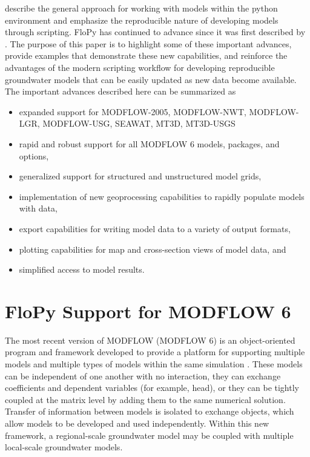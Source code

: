 \documentclass[11pt, oneside]{article}   	%
\begin{document}
\cite{bakker2016scripting} describe the general approach for working with models within the python environment and emphasize the reproducible nature of developing models through scripting.  FloPy has continued to advance since it was first described by \cite{bakker2016scripting}.  The purpose of this paper is to highlight some of these important advances, provide examples that demonstrate these new capabilities, and reinforce the advantages of the modern scripting workflow for developing reproducible groundwater models that can be easily updated as new data become available.  The important advances described here can be summarized as

\begin{itemize}
\item expanded support for MODFLOW-2005, MODFLOW-NWT, MODFLOW-LGR, MODFLOW-USG, SEAWAT, MT3D, MT3D-USGS
\item rapid and robust support for all MODFLOW 6 models, packages, and options,
\item generalized support for structured and unstructured model grids,
\item implementation of new geoprocessing capabilities to rapidly populate models with data, 
\item export capabilities for writing model data to a variety of output formats, 
\item plotting capabilities for map and cross-section views of model data, and
\item simplified access to model results.
\end{itemize}


\section{FloPy Support for MODFLOW 6}

The most recent version of MODFLOW (MODFLOW 6) is an object-oriented program and framework developed to provide a platform for supporting multiple models and multiple types of models within the same simulation \citep{modflow6gwf, modflow6framework, morway2021use}. These models can be independent of one another with no interaction, they can exchange coefficients and dependent variables (for example, head), or they can be tightly coupled at the matrix level by adding them to the same numerical solution. Transfer of information between models is isolated to exchange objects, which allow models to be developed and used independently. Within this new framework, a regional-scale groundwater model may be coupled with multiple local-scale groundwater models. 
\end{document}
